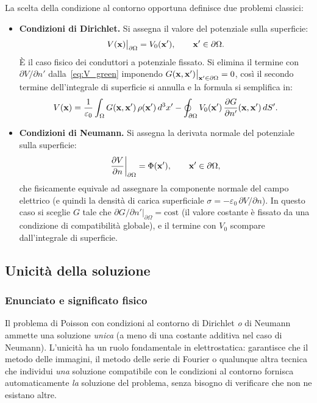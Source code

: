 La scelta della condizione al contorno opportuna definisce due problemi classici:

\begin{itemize}
    \item \textbf{Condizioni di Dirichlet.} Si assegna il valore del potenziale sulla
    superficie:
    \begin{equation}
        V(\mathbf{x})\big|_{\partial\Omega} = V_0(\mathbf{x}'), \qquad \mathbf{x}' \in \partial\Omega.
    \end{equation}
    È il caso fisico dei conduttori a potenziale fissato.
    Si elimina il termine con $\partial V/\partial n'$ dalla~\eqref{eq:V_green}
    imponendo $G(\mathbf{x},\mathbf{x}')\big|_{\mathbf{x}' \in \partial\Omega} = 0$,
    così il secondo termine dell'integrale di superficie si annulla e la formula
    si semplifica in:
    \begin{equation}
        V(\mathbf{x}) = \frac{1}{\varepsilon_0}\int_\Omega G(\mathbf{x},\mathbf{x}')\,\rho(\mathbf{x}')\,d^3x'
        - \oint_{\partial\Omega} V_0(\mathbf{x}')\, \frac{\partial G}{\partial n'}(\mathbf{x},\mathbf{x}')\, dS'.
    \end{equation}

    \item \textbf{Condizioni di Neumann.} Si assegna la derivata normale del potenziale
    sulla superficie:
    \begin{equation}
        \frac{\partial V}{\partial n}\bigg|_{\partial\Omega} = \Phi(\mathbf{x}'),
        \qquad \mathbf{x}' \in \partial\Omega,
    \end{equation}
    che fisicamente equivale ad assegnare la componente normale del campo elettrico
    (e quindi la densità di carica superficiale $\sigma = -\varepsilon_0\,\partial V/\partial n$).
    In questo caso si sceglie $G$ tale che
    $\partial G/\partial n'\big|_{\partial\Omega} = \text{cost}$
    (il valore costante è fissato da una condizione di compatibilità globale),
    e il termine con $V_0$ scompare dall'integrale di superficie.
\end{itemize}

\subsection{Unicità della soluzione}

\subsubsection{Enunciato e significato fisico}

Il problema di Poisson con condizioni al contorno di Dirichlet \emph{o} di Neumann
ammette una soluzione \emph{unica} (a meno di una costante additiva nel caso di
Neumann). L'unicità ha un ruolo fondamentale in elettrostatica: garantisce che il
metodo delle immagini, il metodo delle serie di Fourier o qualunque altra tecnica
che individui \emph{una} soluzione compatibile con le condizioni al contorno fornisca
automaticamente \emph{la} soluzione del problema, senza bisogno di verificare che
non ne esistano altre.

